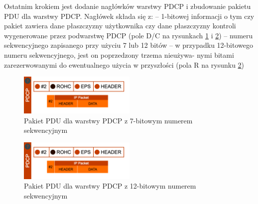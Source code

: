 Ostatnim krokiem jest dodanie nagłówków warstwy PDCP i zbudowanie pakietu PDU dla warstwy PDCP. Nagłówek składa się z:
– 1-bitowej informacji o tym czy pakiet zawiera dane płaszczyzny użytkownika czy dane płaszczyzny kontroli wygenerowane przez podwarstwę PDCP (pole D/C na rysunkach \ref{fig:pdcp4} i \ref{fig:pdcp5})
– numeru sekwencyjnego zapisanego przy użyciu 7 lub 12 bitów
– w przypadku 12-bitowego numeru sekwencyjnego, jest on poprzedzony trzema nieużywa- nymi bitami zarezerwowanymi do ewentualnego użycia w przyszłości (pola R na rysunku \ref{fig:pdcp5})

\begin{figure}
	\centering
		\includegraphics[width=0.5\textwidth]{images/pdcp_2.png}
	\caption{Pakiet PDU dla warstwy PDCP z 7-bitowym numerem sekwencyjnym}
	\label{fig:pdcp4}
\end{figure}

\begin{figure}
	\centering
		\includegraphics[width=0.5\textwidth]{images/pdcp_2.png}
	\caption{Pakiet PDU dla warstwy PDCP z 12-bitowym numerem sekwencyjnym}
	\label{fig:pdcp5}
\end{figure}